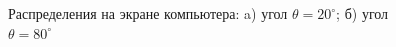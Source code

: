 \documentclass[12pt,a4paper]{article}
\begin{document}
	\begin{figure}[h]
		\begin{minipage}[h]{0.49\linewidth}
		\end{minipage}
		\hfill
		\begin{minipage}[h]{0.49\linewidth}
		\end{minipage}
		\caption{Распределения на экране компьютера: a) угол $\theta = 20^\circ$; б) угол $\theta = 80^\circ$}
	\end{figure}
\end{document}
